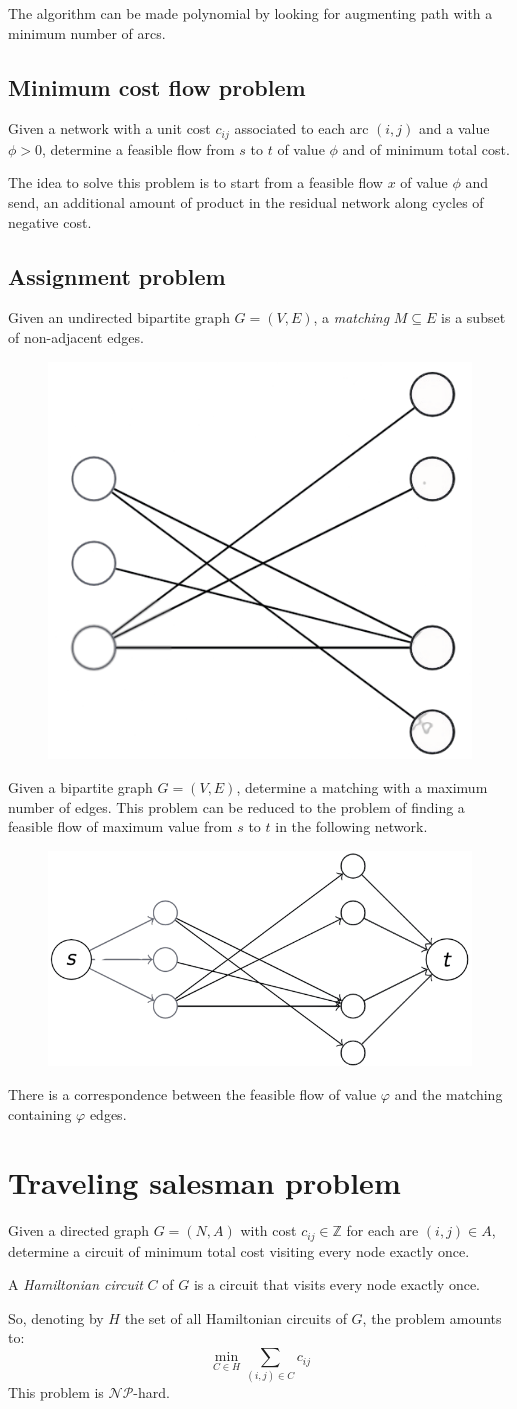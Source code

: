 \documentclass[12pt, a4paper]{report}
\begin{document}
    The algorithm can be made polynomial by looking for augmenting path with a minimum number of arcs. 

    \subsection{Minimum cost flow problem}
    Given a network with a unit cost $c_{ij}$ associated to each arc $(i,j)$ and a value $\phi > 0$, determine a feasible flow from $s$ 
    to $t$ of value $\phi$ and of minimum total cost. 

    The idea to solve this problem is to start from a feasible flow $x$ of value $\phi$ and send, an additional amount of product in the
    residual network along cycles of negative cost. 
    \newpage
    \subsection{Assignment problem}
    \begin{definition}
        Given an undirected bipartite graph $G=(V,E)$, a \emph{matching} $M \subseteq E$ is a subset of non-adjacent edges. 
    \end{definition}
    \begin{figure}[H]
        \centering
        \includegraphics[width=0.2\linewidth]{images/matching.png}
    \end{figure}
    Given a bipartite graph $G=(V,E)$, determine a matching with a maximum number of edges. This problem can be reduced to the problem of
    finding a feasible flow of maximum value from $s$ to $t$ in the following network. 
    \begin{figure}[H]
        \centering
        \includegraphics[width=0.25\linewidth]{images/matchingmod.png}
    \end{figure}
    There is a correspondence between the feasible flow of value $\varphi$ and the matching containing $\varphi$ edges. 

    \section{Traveling salesman problem}
    Given a directed graph $G=(N,A)$ with cost $c_{ij} \in \mathbb{Z}$ for each are $(i,j) \in A$, determine a circuit of minimum total cost visiting every node 
    exactly once. 
    \begin{definition}
        A \emph{Hamiltonian circuit} $C$ of $G$ is a circuit that visits every node exactly once. 
    \end{definition}
    So, denoting by $H$ the set of all Hamiltonian circuits of $G$, the problem amounts to: 
    \[\min_{C \in H}{\sum_{(i,j) \in C}{c_{ij}}}\]
    This problem is $\mathcal{N}\mathcal{P}$-hard. 
\end{document}
